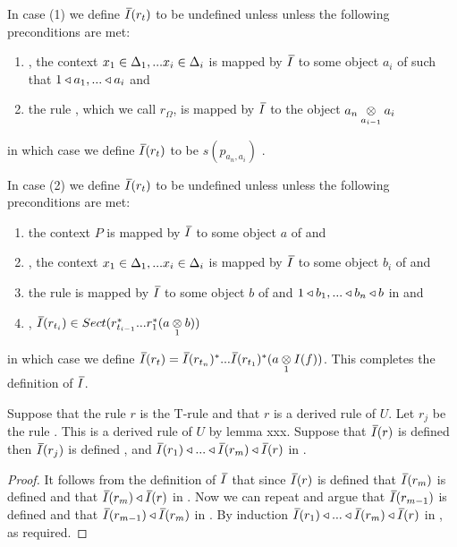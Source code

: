 \begin{definition} 
\begin{enumerate}[(i)]
In  case (1) we define $\Ibar(r_t)$ to be undefined unless  unless the following preconditions are met:
\begin{enumerate}
\item
\foreachi, the context $\xDelta{i}$ is mapped by $\Ibar$ to some object $a_i$ of \catcw such
that $1 \base a_1,...\base a_i$ and
\item the rule , which we call $r_\Omega$, is mapped by $\Ibar$ to the object $\crossx{a_n}{a_i}{a_{i-1}}$
\end{enumerate}
in which case we define $\Ibar(r_t)$ to be $s(p_{a_n,a_i})$ . 

In  case (2) 
we define $\Ibar(r_t)$ to be undefined unless  unless the following preconditions are met:
\begin{enumerate}
\item
the context  $P$ is mapped by $\Ibar$ to some object $a$ of \catcw and 
\item
\foreachi, the context $\xDelta{i}$ is mapped by $\Ibar$ to some object $b_i$ of \catcw
and 
\item the rule  is mapped by $\Ibar$ to some object $b$ of \catcw and
$1 \base b_1,...\base b_n \base b$ in \catcw 
and 
\item
\foreachi, $\Ibar(r_{t_i}) \in Sect(r_{t_{i-1}}^*...r_1^* (\crossx{a}{b}{1}))$
\end{enumerate}
in which case we
define $\Ibar(r_t)=\Ibar(r_{t_n})^*...\Ibar(r_{t_1})^*(\crossx{a}{I(f)}{1})$.
This completes the definition of $\Ibar$.
\end{enumerate}
\end{definition}


\begin{lemma}
Suppose that  the rule $r$ is the T-rule \ZOmega and that $r$ is a derived rule of $U$. 
Let $r_j$ be the rule
. This is a derived rule of $U$ by lemma xxx.
Suppose that $\Ibar(r)$ is defined then
$\Ibar(r_j)$ is defined \foreachj, and 
$\Ibar(r_1) \base  ... \base \Ibar(r_m) \base \Ibar(r)$ in \catc.
\end{lemma}
\begin{proof}
It follows from the definition of $\Ibar$ that since $\Ibar(r)$ is defined that $\Ibar(r_m)$ is defined and that
$\Ibar(r_m) \base \Ibar(r)$ in \catc. Now we can repeat and argue that $\Ibar(r_{m-1})$ is defined and that $\Ibar(r_{m-1}) \base \Ibar(r_m)$
in \catc. By induction $\Ibar(r_1) \base  ... \base \Ibar(r_m) \base \Ibar(r)$ in \catc, as required.
\end{proof}

